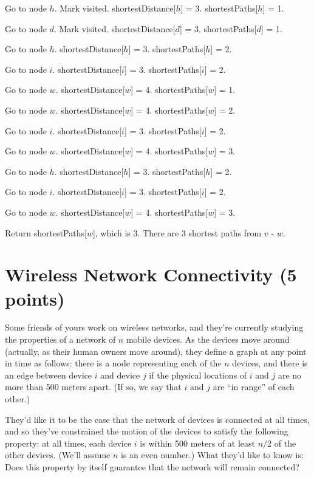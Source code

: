 \documentclass[letter,11pt]{article}
\begin{document}
Go to node $h$. Mark visited. shortestDistance[$h$] = 3. shortestPaths[$h$] = 1.

Go to node $d$. Mark visited. shortestDistance[$d$] = 3. shortestPaths[$d$] = 1.

Go to node $h$. shortestDistance[$h$] = 3. shortestPaths[$h$] = 2.

Go to node $i$. shortestDistance[$i$] = 3. shortestPaths[$i$] = 2.

Go to node $w$. shortestDistance[$w$] = 4. shortestPaths[$w$] = 1.

Go to node $w$. shortestDistance[$w$] = 4. shortestPaths[$w$] = 2.

Go to node $i$. shortestDistance[$i$] = 3. shortestPaths[$i$] = 2.

Go to node $w$. shortestDistance[$w$] = 4. shortestPaths[$w$] = 3.

Go to node $h$. shortestDistance[$h$] = 3. shortestPaths[$h$] = 2.

Go to node $i$. shortestDistance[$i$] = 3. shortestPaths[$i$] = 2.

Go to node $w$. shortestDistance[$w$] = 4. shortestPaths[$w$] = 3.

Return shortestPaths[$w$], which is 3. There are 3 shortest paths from $v$ - $w$.



\section{Wireless Network Connectivity (5 points)}

Some friends of yours work on wireless networks, and they're currently studying the properties of a network of $n$ mobile devices. As the devices move around (actually, as their human owners move around), they define a graph at any point in time as follows: there is a node representing each of the $n$ devices, and there is an edge between device $i$ and device $j$ if the physical locations of $i$ and $j$ are no more than 500 meters apart. (If so, we say that $i$ and $j$ are ``in range'' of each other.)

They'd like it to be the case that the network of devices is connected at all times, and so they've constrained the motion of the devices to satisfy the following property: at all times, each device $i$ is within 500 meters of at least $n/2$ of the other devices. (We'll assume $n$ is an even number.)  What they'd like to know is: Does this property by itself guarantee that the network will remain connected?
\end{document}
